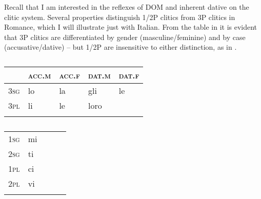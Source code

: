 \documentclass[output=paper,colorlinks,citecolor=brown]{./langscibook}
\begin{document}
Recall that I am interested in the reflexes of DOM and inherent dative on the clitic system. {Several properties distinguish 1/2P clitics from 3P clitics in Romance, which I will illustrate just with Italian. From the table in  it is evident that 3P clitics are differentiated by gender (masculine/feminine) and by case (accusative/dative) – but 1/2P are insensitive to either distinction, as in .}


\begin{table}
\caption{\missingcaption}\label{extab:manzini:11}
\begin{tabularx}{\textwidth}{XXXXX}
\lsptoprule
 & \textsc{acc.m} & \textsc{acc.f} & \textsc{dat.m} & \textsc{dat.f}\\
 \midrule
\textsc{3sg} & {lo} & {la} & {gli} & {le}\\
\textsc{3pl} & {li} & {le} &  {loro} & \\
\lspbottomrule
\end{tabularx}
\end{table}


\begin{table}
\caption{\missingcaption}\label{extab:manzini:12}
\begin{tabularx}{\textwidth}{XXXXX}
\lsptoprule
\textsc{1sg} & {mi} & & &\\
\textsc{2sg} & {ti} & & &\\
\textsc{1pl} & {ci} & & &\\
\textsc{2pl} & {vi} & & &\\
\lspbottomrule
\end{tabularx}
\end{table}
\end{document}
